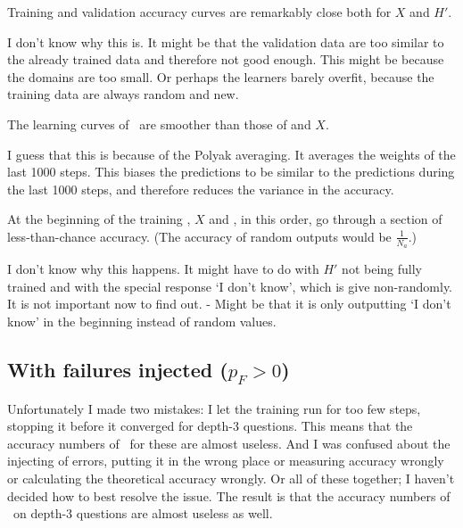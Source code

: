 \documentclass{farlamp}
\begin{document}
\Obs Training and validation accuracy curves are remarkably close both
for $X$ and $H'$.

\Disc I don't know why this is. \OQ It might be that the validation data
are too similar to the already trained data and therefore not good enough. This
might be because the domains are too small. Or perhaps the learners barely
overfit, because the training data are always random and new.


\Obs The learning curves of \Xpa\ are smoother than those of \AmpHp and $X$.

\Disc I guess that this is because of the Polyak averaging. It averages
the weights of the last 1000 steps. This biases the predictions to be similar to
the predictions during the last 1000 steps, and therefore reduces the variance
in the accuracy.


\Obs At the beginning of the training \AmpHp, $X$ and \Xpa, in
this order, go through a section of less-than-chance accuracy. (The accuracy of
random outputs would be $\frac{1}{N_a}$.)

\Disc I don't know why this happens. \OQ It might have to do with $H'$ not being
fully trained and with the special response ‘I don't know’, which is give
non-randomly. It is not important now to find out. - Might be that it is only
outputting ‘I don't know’ in the beginning instead of random values.


\subsection{With failures injected ($p_F > 0$)}

Unfortunately I made two mistakes: I let the training run for too few steps,
stopping it before it converged for depth-3 questions. This means that the
accuracy numbers of \Xpa\ for these are almost useless. And I was confused about
the injecting of errors, putting it in the wrong place or measuring accuracy
wrongly or calculating the theoretical accuracy wrongly. Or all of these
together; I haven't decided how to best resolve the issue. The result is that
the accuracy numbers of \AmpHp\ on depth-3 questions are almost useless as well.
\end{document}
